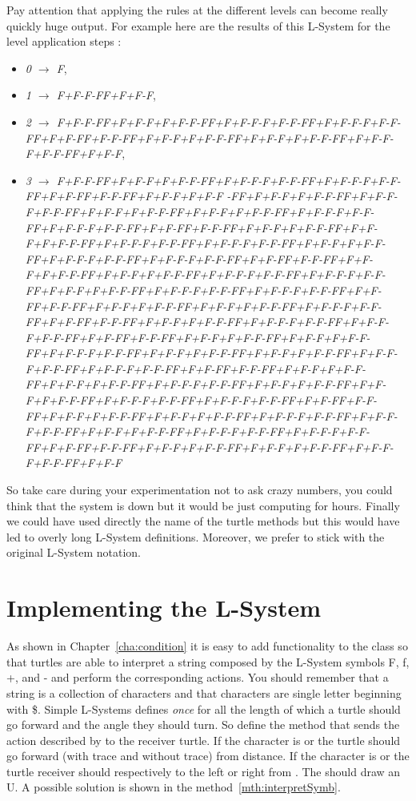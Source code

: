 Pay attention that applying the rules at the different levels can become really quickly huge output. For example here are the results of this L-System  for the level application steps : 
\begin{itemize}
\item \emph{0 $\rightarrow$ F}, 
\item  \emph{1 $\rightarrow$
F+F-F-FF+F+F-F},
\item \emph{ 2 $\rightarrow$
F+F-F-FF+F+F-F+F+F-F-FF+F+F-F-F+F-F-FF+F+F-F-F+F-F-FF+F+F-FF+F-F-FF+F+F-F+F+F-F-FF+F+F-F+F+F-F-FF+F+F-F-F+F-F-FF+F+F-F},
\item \emph{3 $\rightarrow$
F+F-F-FF+F+F-F+F+F-F-FF+F+F-F-F+F-F-FF+F+F-F-F+F-F-FF+F+F-FF+F-F-FF+F+F-F+F+F-F
-FF+F+F-F+F+F-F-FF+F+F-F-F+F-F-FF+F+F-F+F+F-F-FF+F+F-F+F+F-F-FF+F+F-F-F+F-F-FF+F+F-F-F+F-F-FF+F+F-FF+F-F-FF+F+F-F+F+F-F-FF+F+F-F+F+F-F-FF+F+F-F-F+F-F-FF+F+F-F-F+F-F-FF+F+F-F+F+F-F-FF+F+F-F-F+F-F-FF+F+F-F-F+F-F-FF+F+F-FF+F-F-FF+F+F-F+F+F-F-FF+F+F-F+F+F-F-FF+F+F-F-F+F-F-FF+F+F-F-F+F-F-FF+F+F-F+F+F-F-FF+F+F-F-F+F-F-FF+F+F-F-F+F-F-FF+F+F-FF+F-F-FF+F+F-F+F+F-F-FF+F+F-F+F+F-F-FF+F+F-F-F+F-F-FF+F+F-FF+F-F-FF+F+F-F+F+F-F-FF+F+F-F-F+F-F-FF+F+F-F-F+F-F-FF+F+F-FF+F-F-FF+F+F-F+F+F-F-FF+F+F-F+F+F-F-FF+F+F-F-F+F-F-FF+F+F-F+F+F-F-FF+F+F-F+F+F-F-FF+F+F-F-F+F-F-FF+F+F-F-F+F-F-FF+F+F-FF+F-F-FF+F+F-F+F+F-F-FF+F+F-F+F+F-F-FF+F+F-F-F+F-F-FF+F+F-F+F+F-F-FF+F+F-F+F+F-F-FF+F+F-F-F+F-F-FF+F+F-F-F+F-F-FF+F+F-FF+F-F-FF+F+F-F+F+F-F-FF+F+F-F+F+F-F-FF+F+F-F-F+F-F-FF+F+F-F-F+F-F-FF+F+F-F+F+F-F-FF+F+F-F-F+F-F-FF+F+F-F-F+F-F-FF+F+F-FF+F-F-FF+F+F-F+F+F-F-FF+F+F-F+F+F-F-FF+F+F-F-F+F-F-FF+F+F-F}
\end{itemize}

So take care during your experimentation not to ask crazy numbers, you
could think that the system is down but it would be just computing for
hours. Finally we could have used directly the name of the turtle methods but this would have led to overly long L-System definitions. Moreover, we prefer to stick with the original L-System notation.

\section{Implementing the L-System}
As shown in Chapter~\ref{cha:condition} it is easy to add
functionality to the class  so that turtles are able to
interpret a string composed by the L-System symbols F, f, +, and - and
perform the corresponding actions. You should remember that a string
is a collection of characters and that characters are single letter
beginning with \$. Simple L-Systems defines \emph{once} for all the length of which a turtle should go forward and the angle they should turn. So define the method  that sends the action described by  to the receiver turtle. If the character is  or  the turtle should go
forward (with trace and without trace) from  distance. If the
character is \ct{\$+} or \ct{\$-} the turtle receiver should
respectively to the left or right from . The  should draw an U. A possible solution is shown in the method~\ref{mth:interpretSymb}. 

